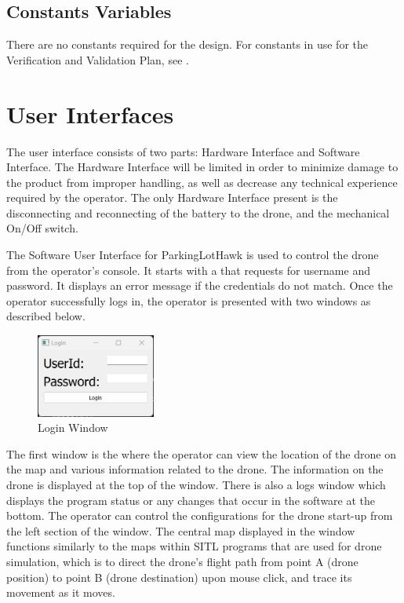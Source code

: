 \documentclass[12pt, titlepage]{article}
\begin{document}
\clearpage

\subsection{Constants Variables}
\label{subsec:Constants Variables}

There are no constants required for the design. For constants in use for the Verification and Validation Plan, see .

\section{User Interfaces}
\label{sec:ui}

The user interface consists of two parts: Hardware Interface and Software Interface. The Hardware Interface will be limited in order to minimize damage to the product from improper handling, as well as decrease any technical experience required by the operator. The only Hardware Interface present is the disconnecting and reconnecting of the battery to the drone, and the mechanical On/Off switch.

The Software User Interface for ParkingLotHawk is used to control the drone from the operator’s console. It starts with a  that requests for username and password. It displays an error message if the credentials do not match. Once the operator successfully logs in, the operator is presented with two windows as described below. \\

\begin{figure}[h!]
  \begin{center} 
  \caption{Login Window}
  \label{LoginWindow}
        \includegraphics[width=0.35\textwidth]{MainLogin.png}
  \end{center}
\end{figure}

The first window is the  where the operator can view the location of the drone on the map and various information related to the drone. The information on the drone is displayed at the top of the window. There is also a logs window which displays the program status or any changes that occur in the software at the bottom. The operator can control the configurations for the drone start-up from the left section of the window. The central map displayed in the window functions similarly to the maps within SITL programs that are used for drone simulation, which is to direct the drone’s flight path from point A (drone position) to point B (drone destination) upon mouse click, and trace its movement as it moves. \\
\end{document}
